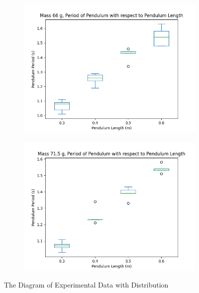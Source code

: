 \documentclass{article}
\begin{document}
\begin{figure}[ht!]
    \begin{subfigure}{0.49\textwidth}
        \centering
        \includegraphics[width=\linewidth]{mass3.png}
        \label{fig:graph_m3}
    \end{subfigure}
    \hfil
    \begin{subfigure}{0.49\textwidth}
        \centering
        \includegraphics[width=\linewidth]{mass4.png}
        \label{fig:graph_m4}
    \end{subfigure}
    \caption{The Diagram of Experimental Data with Distribution}
    \label{fig:graphs}
\end{figure}

\pagebreak
\end{document}
